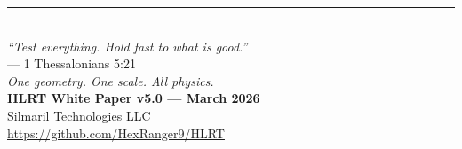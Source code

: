 \documentclass[11pt,letterpaper]{article}
\begin{document}
\vfill
\begin{center}
\rule{0.5\textwidth}{0.4pt}\\[1em]
\textit{``Test everything.  Hold fast to what is good.''}\\
{\small --- 1 Thessalonians 5:21}\\[1em]
\textit{One geometry.  One scale.  All physics.}\\[0.8em]
\textbf{HLRT White Paper v5.0 --- March 2026}\\
Silmaril Technologies LLC\\
\url{https://github.com/HexRanger9/HLRT}
\end{center}
\end{document}
